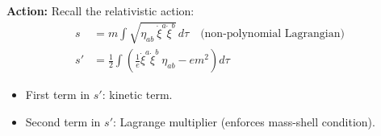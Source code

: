 \documentclass[14pt]{article} %
\begin{document}
\vspace{1em}
\noindent
\textbf{Action:} Recall the relativistic action:
\begin{align*}
    s &= m \int \sqrt{ \eta_{ab}~ \dot{\xi}^a \dot{\xi}^b } \, d\tau 
    \quad \text{(non-polynomial Lagrangian)} \\
    s' &= \frac{1}{2} \int \left( \frac{1}{e} \dot{\xi}^a \dot{\xi}^b~ \eta_{ab} - e m^2 \right) d\tau 
\end{align*}

\begin{itemize}
    \item First term in $s'$: kinetic term.
    \item Second term in $s'$: Lagrange multiplier (enforces mass-shell condition).
\end{itemize}
\end{document}
